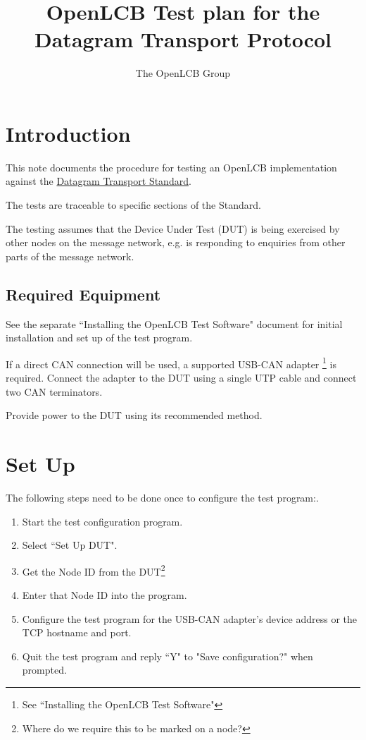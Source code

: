\documentclass[11pt]{article}
\title{OpenLCB Test plan for the Datagram Transport Protocol}
\author{The OpenLCB Group}
\begin{document}
\maketitle


\section{Introduction}

This note documents the procedure for testing an OpenLCB implementation against the 
\href{https://nbviewer.org/github/openlcb/documents/blob/master/standards/DatagramTransportS.pdf}{Datagram Transport Standard}.

The tests are traceable to specific sections of the Standard.

The testing assumes that the Device Under Test (DUT) is being exercised by other
nodes on the message network, 
e.g. is responding to enquiries from other parts of the message network.

\subsection{Required Equipment}

See the separate ``Installing the OpenLCB Test Software" document for initial installation 
and set up of the test program.

If a direct CAN connection will be used,
a supported USB-CAN adapter
    \footnote{See ``Installing the OpenLCB Test Software"}
is required. 
Connect the adapter to the DUT using a single UTP cable and connect two CAN terminators.

Provide power to the DUT using its recommended method.

\section{Set Up}
The following steps need to be done once to configure the test program:.
\begin{enumerate}
\item Start the test configuration program. 
\item Select ``Set Up DUT".
\item Get the Node ID from the DUT\footnote{Where do we require this to be marked on a node?} 
\item Enter that Node ID into the program.
\item Configure the test program for the USB-CAN adapter's device address
        or the TCP hostname and port.
\item Quit the test program and reply ``Y" to "Save configuration?" when prompted.
\end{enumerate}
\end{document}
